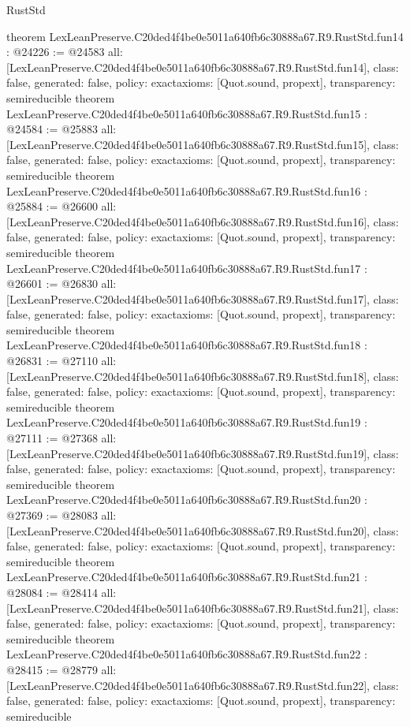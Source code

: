 \begin{lexlean}{RustStd}
\begin{coremodule}
{}
theorem LexLeanPreserve.C20ded4f4be0e5011a640fb6c30888a67.R9.RustStd.fun14 : @24226 := @24583 {
  all: [LexLeanPreserve.C20ded4f4be0e5011a640fb6c30888a67.R9.RustStd.fun14],
  class: false,
  generated: false,
  policy: exact{axioms: [Quot.sound, propext]},
  transparency: semireducible
}
theorem LexLeanPreserve.C20ded4f4be0e5011a640fb6c30888a67.R9.RustStd.fun15 : @24584 := @25883 {
  all: [LexLeanPreserve.C20ded4f4be0e5011a640fb6c30888a67.R9.RustStd.fun15],
  class: false,
  generated: false,
  policy: exact{axioms: [Quot.sound, propext]},
  transparency: semireducible
}
theorem LexLeanPreserve.C20ded4f4be0e5011a640fb6c30888a67.R9.RustStd.fun16 : @25884 := @26600 {
  all: [LexLeanPreserve.C20ded4f4be0e5011a640fb6c30888a67.R9.RustStd.fun16],
  class: false,
  generated: false,
  policy: exact{axioms: [Quot.sound, propext]},
  transparency: semireducible
}
theorem LexLeanPreserve.C20ded4f4be0e5011a640fb6c30888a67.R9.RustStd.fun17 : @26601 := @26830 {
  all: [LexLeanPreserve.C20ded4f4be0e5011a640fb6c30888a67.R9.RustStd.fun17],
  class: false,
  generated: false,
  policy: exact{axioms: [Quot.sound, propext]},
  transparency: semireducible
}
theorem LexLeanPreserve.C20ded4f4be0e5011a640fb6c30888a67.R9.RustStd.fun18 : @26831 := @27110 {
  all: [LexLeanPreserve.C20ded4f4be0e5011a640fb6c30888a67.R9.RustStd.fun18],
  class: false,
  generated: false,
  policy: exact{axioms: [Quot.sound, propext]},
  transparency: semireducible
}
theorem LexLeanPreserve.C20ded4f4be0e5011a640fb6c30888a67.R9.RustStd.fun19 : @27111 := @27368 {
  all: [LexLeanPreserve.C20ded4f4be0e5011a640fb6c30888a67.R9.RustStd.fun19],
  class: false,
  generated: false,
  policy: exact{axioms: [Quot.sound, propext]},
  transparency: semireducible
}
theorem LexLeanPreserve.C20ded4f4be0e5011a640fb6c30888a67.R9.RustStd.fun20 : @27369 := @28083 {
  all: [LexLeanPreserve.C20ded4f4be0e5011a640fb6c30888a67.R9.RustStd.fun20],
  class: false,
  generated: false,
  policy: exact{axioms: [Quot.sound, propext]},
  transparency: semireducible
}
theorem LexLeanPreserve.C20ded4f4be0e5011a640fb6c30888a67.R9.RustStd.fun21 : @28084 := @28414 {
  all: [LexLeanPreserve.C20ded4f4be0e5011a640fb6c30888a67.R9.RustStd.fun21],
  class: false,
  generated: false,
  policy: exact{axioms: [Quot.sound, propext]},
  transparency: semireducible
}
theorem LexLeanPreserve.C20ded4f4be0e5011a640fb6c30888a67.R9.RustStd.fun22 : @28415 := @28779 {
  all: [LexLeanPreserve.C20ded4f4be0e5011a640fb6c30888a67.R9.RustStd.fun22],
  class: false,
  generated: false,
  policy: exact{axioms: [Quot.sound, propext]},
  transparency: semireducible
}
\end{coremodule}
\end{lexlean}
